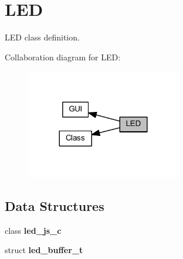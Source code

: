 \section{L\+ED}
\label{group___l_e_d}


L\+ED class definition.  


Collaboration diagram for L\+ED\+:
\nopagebreak
\begin{figure}[H]
\begin{center}
\leavevmode
\includegraphics[width=192pt]{group___l_e_d}
\end{center}
\end{figure}
\subsection*{Data Structures}
\begin{DoxyCompactItemize}
\item 
class \textbf{ led\+\_\+js\+\_\+c}
\item 
struct \textbf{ led\+\_\+buffer\+\_\+t}
\end{DoxyCompactItemize}

